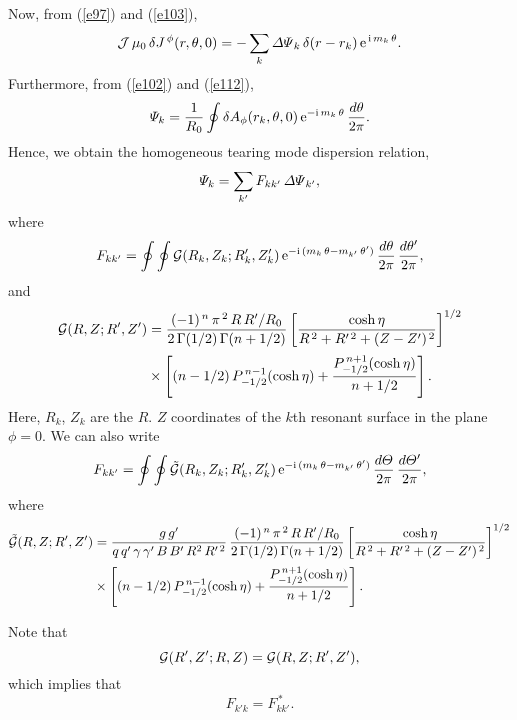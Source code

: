 \documentclass[notitlepage,12pt]{article}
\begin{document}
Now, from (\ref{e97}) and (\ref{e103}), 
\begin{equation}
{\cal J}\,\mu_0\,\delta J^{\,\phi}(r,\theta,0)=-\sum_k {\mit\Delta\Psi}_k\,\delta (r-r_k)\,{\rm e}^{\,{\rm i}\,m_k\,\theta}.
\end{equation}
Furthermore, from (\ref{e102}) and (\ref{e112}), 
\begin{equation}
{\mit\Psi}_k = \frac{1}{R_0}\oint \delta A_{\phi}(r_k,\theta,0)\,{\rm e}^{-{\rm i}\,m_k\,\theta}\,\frac{d\theta}{2\pi}.
\end{equation}
Hence, we obtain the homogeneous tearing mode dispersion relation, 
\begin{equation}
{\mit\Psi}_k = \sum_{k'} F_{kk'}\,{\mit\Delta\Psi}_{k'},
\end{equation}
where
\begin{equation}
F_{kk'} = \oint\oint 
{\cal G}(R_k,Z_k;R_k',Z_k')\,{\rm e}^{-{\rm i}\,(m_k\,\theta-m_{k'}\,\theta')}\,\frac{d\theta}{2\pi}\,\frac{d\theta'}{2\pi},
\end{equation}
and
\begin{align}
{\cal G}(R,Z;R',Z')&= \frac{(-1)^{\,n}\,\pi^{\,2}\,R\,R'/R_0}{2\,\Gamma(1/2)\,\Gamma(n+1/2)}
\left[\frac{\cosh\eta}{R^{\,2}+R'^{\,2}+(Z-Z')^{\,2}}\right]^{1/2}\nonumber\\[0.5ex]
&\times\left[(n-1/2)\,P_{-1/2}^{\,n-1}(\cosh\eta)+
\frac{P_{-1/2}^{\,n+1}(\cosh\eta)}{n+1/2}\right].
\end{align}
Here, $R_k$, $Z_k$ are the $R$. $Z$ coordinates of the $k$th resonant surface in the plane $\phi=0$. 
We can also write 
\begin{equation}
F_{kk'} = \oint\oint 
\tilde{\cal G}(R_k,Z_k;R_k',Z_k')\,{\rm e}^{-{\rm i}\,(m_k\,\theta-m_{k'}\,\theta')}\,\frac{d{\mit\Theta}}{2\pi}\,\frac{d{\mit\Theta}'}{2\pi},
\end{equation}
where
\begin{align}
\tilde{\cal G}(R,Z;R',Z')&= \frac{g\,g'}{q\,q'\,\gamma\,\gamma'\,B\,B'\,R^2\,R'^{\,2}}\, \frac{(-1)^{\,n}\,\pi^{\,2}\,R\,R'/R_0}{2\,\Gamma(1/2)\,\Gamma(n+1/2)}
\left[\frac{\cosh\eta}{R^{\,2}+R'^{\,2}+(Z-Z')^{\,2}}\right]^{1/2}\nonumber\\[0.5ex]
&\times\left[(n-1/2)\,P_{-1/2}^{\,n-1}(\cosh\eta)+
\frac{P_{-1/2}^{\,n+1}(\cosh\eta)}{n+1/2}\right].
\end{align}

Note that
\begin{equation}
{\cal G} (R',Z';R,Z) = {\cal G}(R,Z;R',Z'),
\end{equation}
which implies that
\begin{equation}
F_{k'k} = F_{kk'}^{\,\ast}.
\end{equation}
\end{document}
